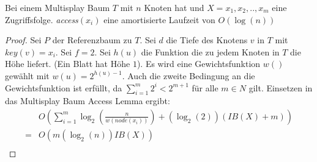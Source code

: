 \documentclass[a4paper,12pt]{article}
\begin{document}
\newtheorem{Satz2}{Satz}[section] 
\begin{Satz1}Bei einem Multisplay Baum $T$ mit $n$ Knoten hat und $X = x_1, x_2,.., x_m$ eine Zugriffsfolge. \textit{access}$\left(x_i\right)$ eine amortisierte Laufzeit von $O\left(\log\left(n\right)\right)$ 
\end{Satz1}
\begin{proof}
	
	Sei $P$ der Referenzbaum zu $T$. Sei $d$ die Tiefe des Knotens $v$ in $T$ mit $\mathit{key}\left(v\right) = x_i$. Sei $f = 2$. Sei $h\left(u\right)$ die Funktion die zu jedem Knoten in $T$ die Höhe liefert. (Ein Blatt hat Höhe $1$). Es wird eine Gewichtsfunktion $w\left(\right)$ gewählt mit  $w\left(u\right) = 2^{h\left(u\right)-1}$. Auch die zweite Bedingung an die Gewichtsfunktion ist erfüllt, da $\sum_{i = 1}^{m} 2^i < 2^{m+1}$ für alle $m \in \mathit{N}$ gilt. Einsetzen in das Multisplay Baum Access Lemma ergibt:
	\begin{align*}
	&O\left(  \sum_{i = 1}^{m} \log_2\left(   \frac{n}{w\left(\textit{node}\left(x_i\right)\right)}  \right)  
	+ \left(\log_2\left( 2\right)\right) \left(\mathit{IB}\left(X\right) + m\right) \right)\\
	=&O\left(m \left(\log_2\left(n\right) \right) \mathit{IB}\left(X\right) \right)\\
	\end{align*}	
\end{proof}






\newpage


\end{document}
